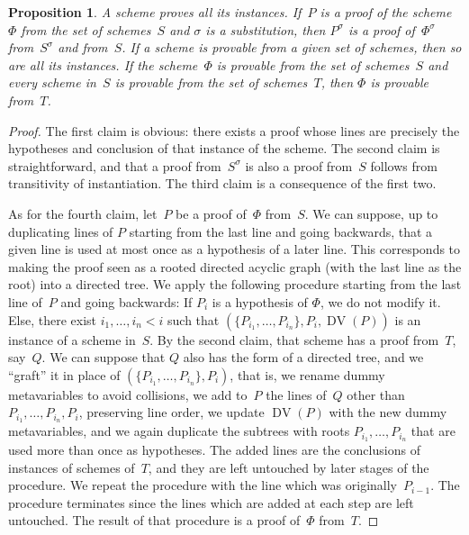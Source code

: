 \documentclass[11pt]{article}
\DeclareMathOperator{\DV}{DV}
\theoremstyle{plain}
\newtheorem{proposition}[theorem]{Proposition}
\theoremstyle{definition}
\theoremstyle{remark}
\begin{document}
\begin{proposition}\label{prop:proof-instance}
A scheme proves all its instances.
If~$P$ is a proof of the scheme~$\Phi$ from the set of schemes~$S$ and $\sigma$ is a substitution,
then $P^\sigma$ is a proof of~$\Phi^\sigma$ from~$S^\sigma$ and from~$S$.
If a scheme is provable from a given set of schemes, then so are all its instances.
If the scheme~$\Phi$ is provable from the set of schemes~$S$ and every scheme in~$S$ is provable
from the set of schemes~$T$, then $\Phi$ is provable from~$T$.
\end{proposition}

\begin{proof}
The first claim is obvious: there exists a proof whose lines are precisely the hypotheses and
conclusion of that instance of the scheme.
The second claim is straightforward, and that a proof from~$S^\sigma$ is also a proof from~$S$
follows from transitivity of instantiation.
The third claim is a consequence of the first two.

As for the fourth claim, let~$P$ be a proof of~$\Phi$ from~$S$.
We can suppose, up to duplicating lines of $P$ starting from the last line and going backwards,
that a given line is used at most once as a hypothesis of a later line.
This corresponds to making the proof seen as a rooted directed acyclic graph (with the last line
as the root) into a directed tree.
We apply the following procedure starting from the last line of~$P$ and going backwards:
If $P_i$ is a hypothesis of $\Phi$, we do not modify it.
Else, there exist $i_1, \dots, i_n < i$ such that $(\{P_{i_1}, \dots, P_{i_n}\}, P_i, \DV(P))$
is an instance of a scheme in~$S$.
By the second claim, that scheme has a proof from~$T$, say~$Q$.
We can suppose that $Q$ also has the form of a directed tree, and we ``graft'' it in place of
$(\{P_{i_1}, \dots, P_{i_n}\}, P_i)$, that is, we rename dummy metavariables to avoid collisions,
we add to~$P$ the lines of~$Q$ other than $P_{i_1}, \dots, P_{i_n}, P_i$, preserving line order,
we update $\DV(P)$ with the new dummy metavariables, and we again duplicate the subtrees with
roots $P_{i_1}, \dots, P_{i_n}$ that are used more than once as hypotheses.
The added lines are the conclusions of instances of schemes of~$T$, and they are left untouched
by later stages of the procedure.
We repeat the procedure with the line which was originally~$P_{i-1}$.
The procedure terminates since the lines which are added at each step are left untouched.
The result of that procedure is a proof of~$\Phi$ from~$T$.
\end{proof}
\end{document}
